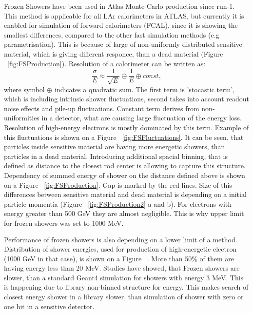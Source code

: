 Frozen Showers have been used in Atlas Monte-Carlo production since run-1. This method is applicable for all LAr calorimeters in ATLAS, but currently it is enabled for simulation of forward calorimeters (FCAL), since it is showing the smallest differences, compared to the other fast simulation methods (e.g parametrisation). This is because of large of non-uniformly distributed sensitive material, which is giving different responce, than a dead material (Figure ~\ref{fig:FSProduction}). Resolution of a calorimeter can be written as:
\begin{equation}\label{eq:EMResoultion}
\frac{\sigma}{E} \approx \frac{1}{\sqrt{E}}	\oplus \frac{1}{E} 	\oplus const,
\end{equation}
where symbol $\oplus$ indicates a quadratic sum. The first term is 'stocastic term', which is including intrinsic shower fluctuations, second takes into account readout noise effects and pile-up fluctuations. Constant term derives from non-uniformities in a detector, what are causing large fluctuation of the energy loss. Resolution of high-energy electrons is mostly dominated by this term. Example of this fluctuations is shown on a Figure ~\ref{fig:FSFluctuations}. It can be seen, that particles inside sensitive material are having more energetic showers, than particles in a dead material. Introducing additional spacial binning, that is defined as distance to the closest rod center is allowing to capture this structure. Dependency of summed energy of shower on the distance defined above is shown on a Figure ~\ref{fig:FSProduction}. Gap is marked by the red lines. Size of this differences between sensitive material and dead material is depending on a initial particle momentia (Figure ~\ref{fig:FSProduction2} a and b). For electrons with energy greater than 500 GeV they are almost negligible. This is why upper limit for frozen showers was set to 1000 MeV.
\begin{figure}
\end{figure}

Performance of frozen showers is also depending on a lower limit of a method. 
Distribution of shower energies, used for production of high-energetic electron (1000 GeV in that case), is shown on a Figure ~. More than 50\% of them are having energy less than 20 MeV. Studies have showed, that Frozen showers are slower, than a standard Geant4 simulation for showers with energy 3 MeV. This is happening due to library non-binned structure for energy. This makes search of closest energy shower in a library slower, than simulation of shower with zero or one hit in a sensitive detector. 

